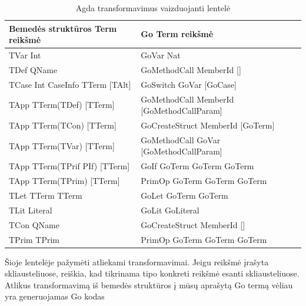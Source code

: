 \documentclass{VUMIFPSkursinis}
\begin{document}
\begin{center}
	\begin{table}[h]
		\caption{Agda transformavimus vaizduojanti lentelė}
	\begin{tabular}{ |l|l| } 
	\hline
	\textbf{Bemedės struktūros Term reikšmė} & \textbf{Go Term reikšmė}  \\
	\hline
	TVar Int & GoVar Nat \\ 
	\hline
	TDef QName & GoMethodCall MemberId [] \\ 
	\hline
	TCase Int CaseInfo TTerm [TAlt] & GoSwitch GoVar [GoCase] \\ 
	\hline
	TApp TTerm(TDef) [TTerm] & GoMethodCall MemberId [GoMethodCallParam] \\ 
	\hline
	TApp TTerm(TCon) [TTerm] & GoCreateStruct MemberId [GoTerm] \\ 
	\hline
	TApp TTerm(TVar) [TTerm] & GoMethodCall GoVar [GoMethodCallParam] \\ 
	\hline
	TApp TTerm(TPrif PIf) [TTerm] & GoIf GoTerm GoTerm GoTerm \\ 
	\hline
	TApp TTerm(TPrim) [TTerm] & PrimOp GoTerm GoTerm GoTerm \\ 
	\hline
	TLet TTerm TTerm & GoLet GoTerm GoTerm \\ 
	\hline
	TLit Literal & GoLit GoLiteral \\ 
	\hline
	TCon QName & GoCreateStruct MemberId [] \\ 
	\hline
	TPrim TPrim & PrimOp GoTerm GoTerm GoTerm \\ 
	\hline
	\end{tabular}
\end{table}
	\end{center}
	Šioje lentelėje pažymėti atliekami transformavimai. Jeigu reikšmė įrašyta skliausteliuose, reiškia, kad tikrinama tipo konkreti reikšmė esanti skliausteliuose. Atlikus transformavimą iš bemedės struktūros į mūsų aprašytą Go termą vėliau yra generuojamas Go kodas
\end{document}
